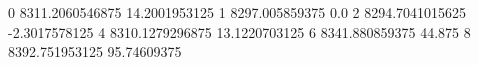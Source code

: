 0 8311.2060546875 14.2001953125
1 8297.005859375 0.0
2 8294.7041015625 -2.3017578125
4 8310.1279296875 13.1220703125
6 8341.880859375 44.875
8 8392.751953125 95.74609375
